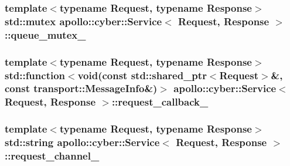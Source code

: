 \hypertarget{classapollo_1_1cyber_1_1Service_ae8f3674803541ccafb1946cd987d25e1}{
\subsubsection[{queue\-\_\-mutex\-\_\-}]{\setlength{\rightskip}{0pt plus 5cm}template$<$typename Request, typename Response$>$ std\-::mutex {\bf apollo\-::cyber\-::\-Service}$<$ Request, Response $>$\-::queue\-\_\-mutex\-\_\-\hspace{0.3cm}{\ttfamily [private]}}}\label{classapollo_1_1cyber_1_1Service_ae8f3674803541ccafb1946cd987d25e1}
\hypertarget{classapollo_1_1cyber_1_1Service_aad642b07ca0bac7ac1304ca1bb946eed}{
\subsubsection[{request\-\_\-callback\-\_\-}]{\setlength{\rightskip}{0pt plus 5cm}template$<$typename Request, typename Response$>$ std\-::function$<$void(const std\-::shared\-\_\-ptr$<$Request$>$\&, const {\bf transport\-::\-Message\-Info}\&)$>$ {\bf apollo\-::cyber\-::\-Service}$<$ Request, Response $>$\-::request\-\_\-callback\-\_\-\hspace{0.3cm}{\ttfamily [private]}}}\label{classapollo_1_1cyber_1_1Service_aad642b07ca0bac7ac1304ca1bb946eed}
\hypertarget{classapollo_1_1cyber_1_1Service_a7d608dfbc0ca4ca0b049bd98a2414769}{
\subsubsection[{request\-\_\-channel\-\_\-}]{\setlength{\rightskip}{0pt plus 5cm}template$<$typename Request, typename Response$>$ std\-::string {\bf apollo\-::cyber\-::\-Service}$<$ Request, Response $>$\-::request\-\_\-channel\-\_\-\hspace{0.3cm}{\ttfamily [private]}}}\label{classapollo_1_1cyber_1_1Service_a7d608dfbc0ca4ca0b049bd98a2414769}
